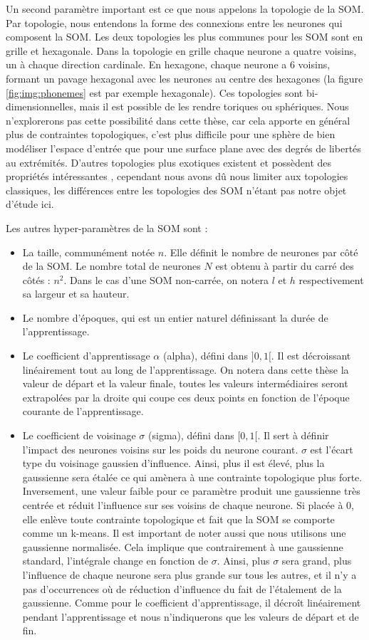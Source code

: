 	Un second paramètre important est ce que nous appelons la topologie de la SOM. Par topologie, nous entendons la forme des connexions entre les neurones qui composent la SOM. Les deux topologies les plus communes pour les SOM sont en grille et hexagonale. Dans la topologie en grille chaque neurone a quatre voisins, un à chaque direction cardinale. En hexagone, chaque neurone a 6 voisins, formant un pavage hexagonal avec les neurones au centre des hexagones (la figure \ref{fig:img:phonemes} est par exemple hexagonale). Ces topologies sont bi-dimensionnelles, mais il est possible de les rendre toriques ou sphériques. Nous n'explorerons pas cette possibilité dans cette thèse, car cela apporte en général plus de contraintes topologiques, c'est plus difficile pour une sphère de bien modéliser l'espace d'entrée que pour une surface plane avec des degrés de libertés au extrémités. D'autres topologies plus exotiques existent et possèdent des propriétés intéressantes \cite{bernard2018np}, cependant nous avons dû nous limiter aux topologies classiques, les différences entre les topologies des SOM n'étant pas notre objet d'étude ici.

	Les autres hyper-paramètres de la SOM sont : 
	\begin{itemize}
	\item La taille, communément notée $n$. Elle définit le nombre de neurones par côté de la SOM. Le nombre total de neurones $N$ est obtenu à partir du carré des côtés : $n^2$. Dans le cas d'une SOM non-carrée, on notera $l$ et $h$ respectivement sa largeur et sa hauteur. 
	\item Le nombre d'époques, qui est un entier naturel définissant la durée de l'apprentissage. 
	\item Le coefficient d'apprentissage $\alpha$ (alpha), défini dans $]0,1[$. Il est décroissant linéairement tout au long de l'apprentissage. On notera dans cette thèse la valeur de départ et la valeur finale, toutes les valeurs intermédiaires seront extrapolées par la droite qui coupe ces deux points en fonction de l'époque courante de l'apprentissage. 
	\item Le coefficient de voisinage $\sigma$ (sigma), défini dans $[0,1[$. Il sert à définir l'impact des neurones voisins sur les poids du neurone courant. $\sigma$ est l'écart type du voisinage gaussien d'influence. Ainsi, plus il est élevé, plus la gaussienne sera étalée ce qui amènera à une contrainte topologique plus forte. Inversement, une valeur faible pour ce paramètre produit une gaussienne très centrée et réduit l'influence sur ses voisins de chaque neurone. Si placée à 0, elle enlève toute contrainte topologique et fait que la SOM se comporte comme un k-means. Il est important de noter aussi que nous utilisons une gaussienne normalisée. Cela implique que contrairement à une gaussienne standard, l'intégrale change en fonction de $\sigma$. Ainsi, plus $\sigma$ sera grand, plus l'influence de chaque neurone sera plus grande sur tous les autres, et il n'y a pas d'occurrences où de réduction d'influence du fait de l'étalement de la gaussienne. Comme pour le coefficient d'apprentissage, il décroît linéairement pendant l'apprentissage et nous n'indiquerons que les valeurs de départ et de fin. 
	\end{itemize}
	

